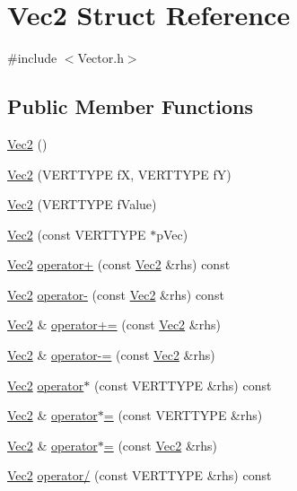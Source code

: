 \hypertarget{struct_vec2}{
\section{Vec2 Struct Reference}
\label{struct_vec2}
}


{\ttfamily \#include $<$Vector.h$>$}

\subsection*{Public Member Functions}
\begin{DoxyCompactItemize}
\item 
\hyperlink{struct_vec2_a76080feed7005893ecc634f903cfbae0}{Vec2} ()
\item 
\hyperlink{struct_vec2_a0f9a03e6c57a2dbbf919a237b710a999}{Vec2} (VERTTYPE fX, VERTTYPE fY)
\item 
\hyperlink{struct_vec2_ae5da8d83c3892ebae914574d83217335}{Vec2} (VERTTYPE fValue)
\item 
\hyperlink{struct_vec2_afa596caa96f79e58094d0313c9041c4e}{Vec2} (const VERTTYPE $\ast$pVec)
\item 
\hyperlink{struct_vec2}{Vec2} \hyperlink{struct_vec2_a5aa4bd05c9e8e57239ad1e0991553417}{operator+} (const \hyperlink{struct_vec2}{Vec2} \&rhs) const 
\item 
\hyperlink{struct_vec2}{Vec2} \hyperlink{struct_vec2_aa166669546d349bfa132966953ff8c9a}{operator-\/} (const \hyperlink{struct_vec2}{Vec2} \&rhs) const 
\item 
\hyperlink{struct_vec2}{Vec2} \& \hyperlink{struct_vec2_aa922a520def297fde9d46b95c1c849dc}{operator+=} (const \hyperlink{struct_vec2}{Vec2} \&rhs)
\item 
\hyperlink{struct_vec2}{Vec2} \& \hyperlink{struct_vec2_acf1ae949d266fbfe8573de7486d48827}{operator-\/=} (const \hyperlink{struct_vec2}{Vec2} \&rhs)
\item 
\hyperlink{struct_vec2}{Vec2} \hyperlink{struct_vec2_aeee78669b299d7862a54cb4abf6a11d0}{operator$\ast$} (const VERTTYPE \&rhs) const 
\item 
\hyperlink{struct_vec2}{Vec2} \& \hyperlink{struct_vec2_a4fa394b17bebe0ab2ffadf2cc983803d}{operator$\ast$=} (const VERTTYPE \&rhs)
\item 
\hyperlink{struct_vec2}{Vec2} \& \hyperlink{struct_vec2_a0d257366c26da3996836419178b9c400}{operator$\ast$=} (const \hyperlink{struct_vec2}{Vec2} \&rhs)
\item 
\hyperlink{struct_vec2}{Vec2} \hyperlink{struct_vec2_a4e1cae1a5baf0ff8fb7da7ea31a1eb6c}{operator/} (const VERTTYPE \&rhs) const 

\end{DoxyCompactItemize}
